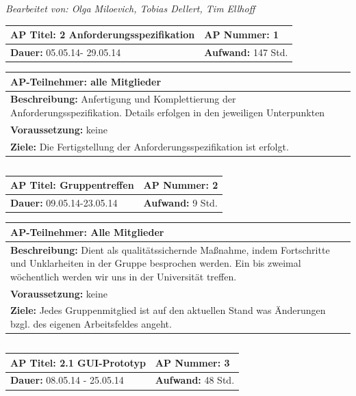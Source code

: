 \documentclass[fontsize=12pt,paper=a4,twoside]{scrartcl}
\begin{document}
\textit{Bearbeitet von: Olga Miloevich, Tobias Dellert, Tim Ellhoff}\\

\begin{tabular}{|p{7.43cm}|p{7.43cm}|}
\hline
\textbf{AP Titel: }2 Anforderungsspezifikation & \textbf{AP Nummer: 1} \\ 
\hline
\textbf{Dauer: } 05.05.14- 29.05.14 & \textbf{Aufwand: }147 Std.\\
\hline
\end{tabular}
\begin{tabular}{|p{15.3cm}|}
\hline
\textbf{AP-Teilnehmer: } alle Mitglieder\\
\hline
\textbf{Beschreibung: }Anfertigung und Komplettierung der Anforderungsspezifikation. Details erfolgen in den jeweiligen Unterpunkten\\
\hline
\textbf{Voraussetzung: }keine \\
\hline 
\textbf{Ziele: }Die Fertigstellung der Anforderungsspezifikation ist erfolgt.\\
\hline 
\end{tabular}
\begin{verbatim}

\end{verbatim}
\begin{tabular}{|p{7.43cm}|p{7.43cm}|}
\hline
\textbf{AP Titel: } Gruppentreffen & \textbf{AP Nummer: 2} \\ 
\hline
\textbf{Dauer: }09.05.14-23.05.14 & \textbf{Aufwand: }9 Std.\\
\hline
\end{tabular}
\begin{tabular}{|p{15.3cm}|}
\hline
\textbf{AP-Teilnehmer: } Alle Mitglieder\\
\hline
\textbf{Beschreibung: }Dient als qualitätssichernde Maßnahme,
indem Fortschritte und Unklarheiten in der Gruppe besprochen werden.
Ein bis zweimal wöchentlich werden wir uns in der Universität treffen.\\
\hline
\textbf{Voraussetzung: }keine\\
\hline 
\textbf{Ziele: }Jedes Gruppenmitglied ist auf den aktuellen Stand was Änderungen bzgl. des eigenen Arbeitsfeldes angeht.\\
\hline 
\end{tabular}
\begin{verbatim}

\end{verbatim}
\begin{tabular}{|p{7.43cm}|p{7.43cm}|}
\hline
\textbf{AP Titel: }2.1 GUI-Prototyp & \textbf{AP Nummer: }3 \\ 
\hline
\textbf{Dauer: }08.05.14 - 25.05.14 & \textbf{Aufwand: }48 Std.\\
\hline
\end{tabular}
\end{document}
